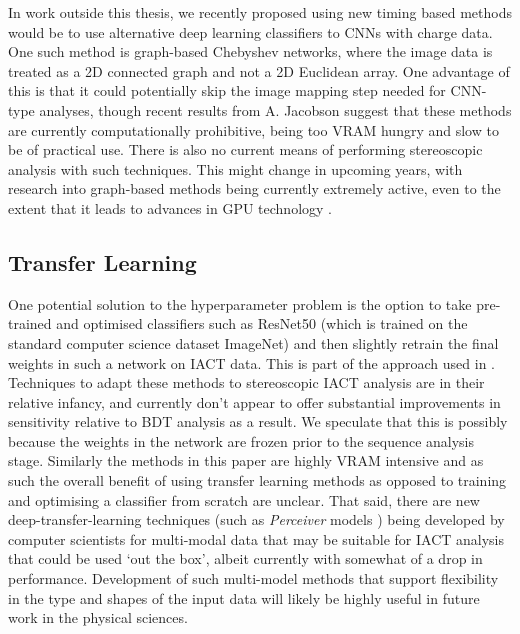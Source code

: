 In work outside this thesis, we recently proposed using new timing based methods would be to use alternative deep learning classifiers to CNNs with charge data. One such method is graph-based Chebyshev networks, where the image data is treated as a 2D connected graph and not a 2D Euclidean array. One advantage of this is that it could potentially skip the image mapping step needed for CNN-type analyses, though recent results from A. Jacobson \cite{adithesis} suggest that these methods are currently computationally prohibitive, being too VRAM hungry and slow to be of practical use. There is also no current means of performing stereoscopic analysis with such techniques. This might change in upcoming years, with research into graph-based methods being currently extremely active, even to the extent that it leads to advances in GPU technology  \cite{graphcore}.

\subsection{Transfer Learning}
One potential solution to the hyperparameter problem is the option to take pre-trained and optimised classifiers such as ResNet50 \cite{resnet50} (which is trained on the standard computer science dataset ImageNet) and then slightly retrain the final weights in such a network on IACT data. This is part of the approach used in \cite{tjarkicrc}. Techniques to adapt these methods to stereoscopic IACT analysis are in their relative infancy, and currently don't appear to offer substantial improvements in sensitivity relative to BDT analysis as a result. We speculate that this is possibly because the weights in the network are frozen prior to the sequence analysis stage. Similarly the methods in this paper are highly VRAM intensive and as such the overall benefit of using transfer learning methods as opposed to training and optimising a classifier from scratch are unclear. That said, there are new deep-transfer-learning techniques (such as \textit{Perceiver} models \cite{perceiver}) being developed by computer scientists for multi-modal data that may be suitable for IACT analysis that could be used `out the box', albeit currently with somewhat of a drop in performance. Development of such multi-model methods that support flexibility in the type and shapes of the input data will likely be highly useful in future work in the physical sciences.

